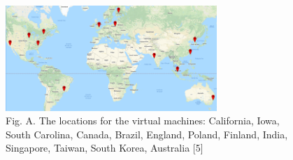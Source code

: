 \begin{figure}[htpb]
    \centering
    \includegraphics[width=8cm]{figures_and_tables/map.png}
    \caption{Fig. A. The locations for the virtual machines: California, Iowa, South Carolina, Canada, Brazil, England, Poland, Finland, India, Singapore, Taiwan, South Korea, Australia [5]}
    \label{fig:map}
\end{figure}